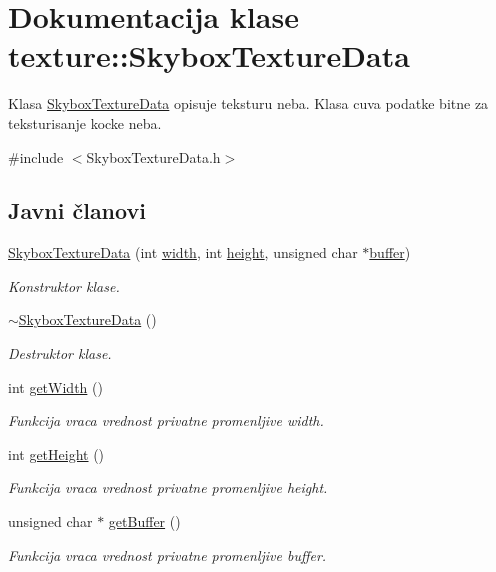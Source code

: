 \hypertarget{classtexture_1_1SkyboxTextureData}{}\section{Dokumentacija klase texture\+:\+:Skybox\+Texture\+Data}
\label{classtexture_1_1SkyboxTextureData}


Klasa \hyperlink{classtexture_1_1SkyboxTextureData}{Skybox\+Texture\+Data} opisuje teksturu neba. Klasa cuva podatke bitne za teksturisanje kocke neba.  




{\ttfamily \#include $<$Skybox\+Texture\+Data.\+h$>$}

\subsection*{Javni članovi}
\begin{DoxyCompactItemize}
\item 
\hyperlink{classtexture_1_1SkyboxTextureData_aeefd7cfb2aff6989bf6fff15f4d9ba12}{Skybox\+Texture\+Data} (int \hyperlink{classtexture_1_1SkyboxTextureData_a25bc82e26b87789657821ac97bedce70}{width}, int \hyperlink{classtexture_1_1SkyboxTextureData_a84d53105b97dad004f7699ccfd8342eb}{height}, unsigned char $\ast$\hyperlink{classtexture_1_1SkyboxTextureData_a886497e955648aba2f465c6a7ba91c3f}{buffer})
\begin{DoxyCompactList}\small\item\em Konstruktor klase. \end{DoxyCompactList}\item 
\hyperlink{classtexture_1_1SkyboxTextureData_ac6d27e7d8f38c283c249019ec3ac4255}{$\sim$\+Skybox\+Texture\+Data} ()
\begin{DoxyCompactList}\small\item\em Destruktor klase. \end{DoxyCompactList}\item 
int \hyperlink{classtexture_1_1SkyboxTextureData_a216985ffe51ed362c3e29c167767496e}{get\+Width} ()
\begin{DoxyCompactList}\small\item\em Funkcija vraca vrednost privatne promenljive width. \end{DoxyCompactList}\item 
int \hyperlink{classtexture_1_1SkyboxTextureData_acc1182e6b2f28ef7a138b6a87bec0c22}{get\+Height} ()
\begin{DoxyCompactList}\small\item\em Funkcija vraca vrednost privatne promenljive height. \end{DoxyCompactList}\item 
unsigned char $\ast$ \hyperlink{classtexture_1_1SkyboxTextureData_af8deb6b45d692667675e34f67fd3daa1}{get\+Buffer} ()
\begin{DoxyCompactList}\small\item\em Funkcija vraca vrednost privatne promenljive buffer. \end{DoxyCompactList}\end{DoxyCompactItemize}
